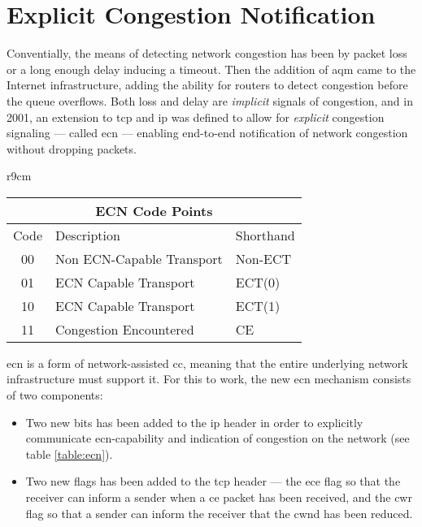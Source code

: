 \section{Explicit Congestion Notification}

Conventially, the means of detecting network congestion has been by packet loss or a long enough delay inducing a timeout. Then the addition of \gls{aqm} came to the Internet infrastructure, adding the ability for routers to detect congestion before the queue overflows. Both loss and delay are \textit{implicit} signals of congestion, and in 2001, an extension to \gls{tcp} and \gls{ip} was defined \cite{rfc3168} to allow for \textit{explicit} congestion signaling --- called \gls{ecn} --- enabling end-to-end notification of network congestion without dropping packets.

\begin{wraptable}{r}{9cm}
    \begin{tabular}{|c|l|l|}
        \multicolumn{3}{c}{ECN Code Points} \\
        \hline
        Code & Description & Shorthand \\
        \hline
        00 & Non ECN-Capable Transport & Non-ECT \\
        \hline
        01 & ECN Capable Transport & ECT(0) \\
        \hline
        10 & ECN Capable Transport & ECT(1) \\
        \hline
        11 & Congestion Encountered & CE \\
        \hline
    \end{tabular}
    \caption{The four different code points for \gls{ecn} that is encoded in the \gls{ip} header.}
    \label{table:ecn}
\end{wraptable}

\gls{ecn} is a form of network-assisted \gls{cc}, meaning that the entire underlying network infrastructure must support it. For this to work, the new \gls{ecn} mechanism consists of two components:

\begin{itemize}
    \item Two new bits has been added to the \gls{ip} header in order to explicitly communicate \gls{ecn}-capability and indication of congestion on the network (see table \ref{table:ecn}).
    \item Two new flags has been added to the \gls{tcp} header --- the \gls{ece} flag so that the receiver can inform a sender when a \gls{ce} packet has been received, and the \gls{cwr} flag so that a sender can inform the receiver that the \gls{cwnd} has been reduced.
\end{itemize}

